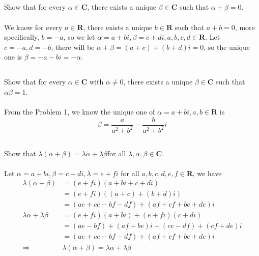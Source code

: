 \documentclass[a4paper]{article}
\begin{document}
\subsection{}
Show that for every $\alpha \in \bm{C}$, there exists a unique $\beta \in \bm{C}$ such that $\alpha + \beta = 0$.
\paragraph{}
We know for every $a \in \bm{R}$, there exists a unique $b \in \bm{R}$ such that $a + b = 0$, more specifically, $b = -a$,
so we let $\alpha = a + bi,\beta = c + di, a,b,c,d\in \bm{R}$.
Let $c = -a, d = -b$, there will be $\alpha + \beta = (a + c) + (b + d)i = 0$, so the unique one is $\beta = - a - bi = -\alpha$.

\subsection{}
Show that for every $\alpha \in \bm{C}$ with $\alpha\neq 0$, there exists a unique $\beta \in \bm{C}$ such that $\alpha\beta = 1$.
\paragraph{}
From the Problem 1, we know the unique one of $\alpha = a + bi, a,b\in \bm{R}$ is
$$
    \beta = \frac{a}{a^2+b^2} - \frac{b}{a^2+b^2}i
$$

\subsection{}
Show that $\lambda(\alpha+\beta)=\lambda\alpha+\lambda\beta$for all $\lambda,\alpha,\beta\in\bm{C}$.
\paragraph{}
Let $\alpha = a + bi, \beta = c + di, \lambda = e + fi$ for all $a,b,c,d,e,f \in \bm{R}$, we have
$$
    \begin{aligned}
        \lambda(\alpha+\beta)
                          & = (e+fi)(a+bi+c+di)                              \\
                          & =(e+fi)((a+c)+(b+d)i)                            \\
                          & =(ae+ce-bf-df)+(af+cf+be+de)i                    \\
        \lambda\alpha+\lambda\beta
                          & =(e+fi)(a+bi)+(e+fi)(c+di)                       \\
                          & =(ae-bf)+(af+be)i+(ce-df)+(cf+de)i               \\
                          & =(ae+ce-bf-df)+(af+cf+be+de)i                    \\
        \Rightarrow \quad & \lambda(\alpha+\beta)=\lambda\alpha+\lambda\beta
    \end{aligned}
$$
\end{document}
